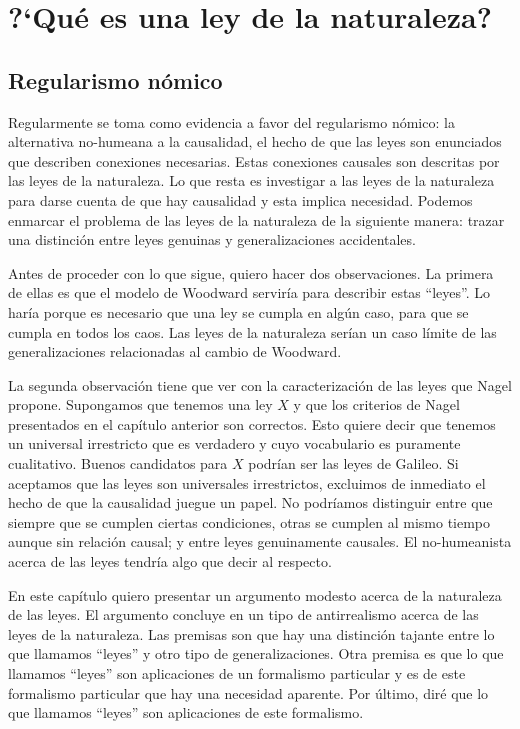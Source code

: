 \chapter{?`Qué es una ley de la naturaleza?}

\section{Regularismo nómico}

\noindent Regularmente se toma como evidencia a favor del regularismo nómico: la alternativa no-humeana a la causalidad, el hecho de que las leyes son enunciados que describen conexiones necesarias. Estas conexiones causales son descritas por las leyes de la naturaleza. Lo que resta es investigar a las leyes de la naturaleza para darse cuenta de que hay causalidad y esta implica necesidad. Podemos enmarcar el problema de las leyes de la naturaleza de la siguiente manera: trazar una distinción entre leyes genuinas y generalizaciones accidentales.

Antes de proceder con lo que sigue, quiero hacer dos observaciones. La primera de ellas es que el modelo de Woodward serviría para describir estas ``leyes''. Lo haría porque es necesario que una ley se cumpla en algún caso, para que se cumpla en todos los caos. Las leyes de la naturaleza serían un caso límite de las generalizaciones relacionadas al cambio de Woodward.

La segunda observación tiene que ver con la caracterización de las leyes que Nagel propone. Supongamos que tenemos una ley $X$ y que los criterios de Nagel presentados en el capítulo anterior son correctos. Esto quiere decir que tenemos un universal irrestricto que es verdadero y cuyo vocabulario es puramente cualitativo. Buenos candidatos para $X$ podrían ser las leyes de Galileo. Si aceptamos que las leyes son universales irrestrictos, excluimos de inmediato el hecho de que la causalidad juegue un papel. No podríamos distinguir entre que siempre que se cumplen ciertas condiciones, otras se cumplen al mismo tiempo aunque sin relación causal; y entre leyes genuinamente causales. El no-humeanista acerca de las leyes tendría algo que decir al respecto.

En este capítulo quiero presentar un argumento modesto acerca de la naturaleza de las leyes. El argumento concluye en un tipo de antirrealismo acerca de las leyes de la naturaleza. Las premisas son que hay una distinción tajante entre lo que llamamos ``leyes'' y otro tipo de generalizaciones. Otra premisa es que lo que llamamos ``leyes'' son aplicaciones de un formalismo particular y es de este formalismo particular que hay una necesidad aparente. Por último, diré que lo que llamamos ``leyes'' son aplicaciones de este formalismo.

